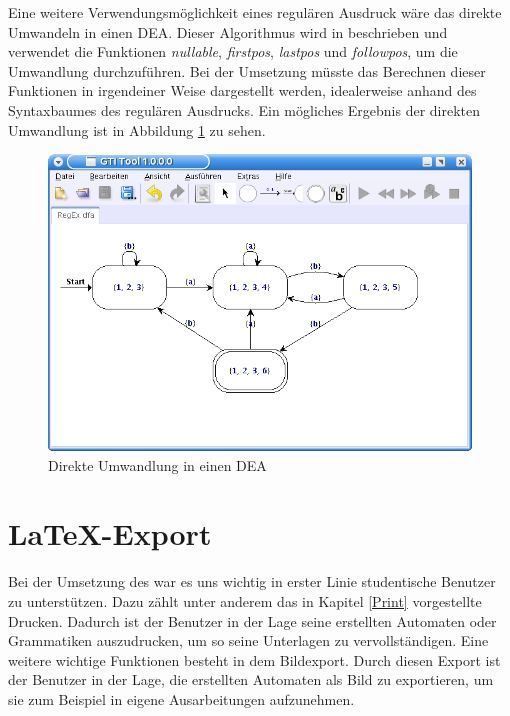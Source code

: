 Eine weitere Verwendungsmöglichkeit eines regulären Ausdruck wäre das direkte
Umwandeln in einen DEA. Dieser Algorithmus wird in
\cite[S. 175ff]{Compilers} beschrieben und verwendet die Funktionen
\textit{nullable}, \textit{firstpos}, \textit{lastpos} und \textit{followpos},
um die Umwandlung durchzuführen. Bei der Umsetzung müsste das Berechnen dieser
Funktionen in irgendeiner Weise dargestellt werden, idealerweise anhand des
Syntaxbaumes des regulären Ausdrucks. Ein mögliches Ergebnis der direkten
Umwandlung ist in Abbildung \ref{FigureRegExDFA} zu sehen.\vspace{10pt}

\begin{figure}[h!]
\begin{center}
\includegraphics[width=12cm]{../images/regex_dfa.png}
\caption{Direkte Umwandlung in einen DEA}
\label{FigureRegExDFA}
\end{center}
\end{figure}
\vspace{10pt}


\section{\LaTeX-Export}

Bei der Umsetzung des \gtitools war es uns wichtig in erster Linie studentische
Benutzer zu unterstützen. Dazu zählt unter anderem das in Kapitel \ref{Print}
vorgestellte Drucken. Dadurch ist der Benutzer in der Lage seine erstellten
Automaten oder Grammatiken auszudrucken, um so seine Unterlagen zu
vervollständigen. Eine weitere wichtige Funktionen besteht in dem Bildexport.
Durch diesen Export ist der Benutzer in der Lage, die erstellten Automaten als
Bild zu exportieren, um sie zum Beispiel in eigene Ausarbeitungen
aufzunehmen.\vspace{10pt}

